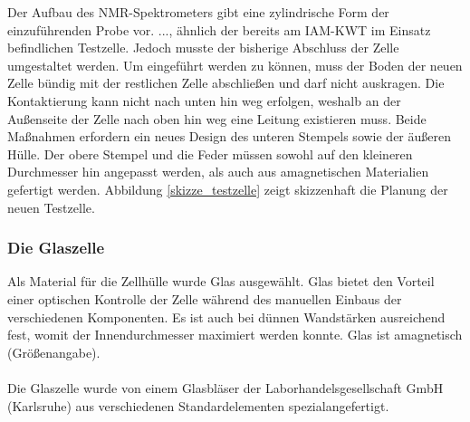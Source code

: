 \documentclass[a4paper, 11pt, headsepline,footsepline,twoside,abstract]{scrbook}
\begin{document}
Der Aufbau des NMR-Spektrometers gibt eine zylindrische Form der einzuführenden Probe vor. ..., ähnlich der bereits am IAM-KWT im Einsatz befindlichen Testzelle. Jedoch musste der bisherige Abschluss der Zelle umgestaltet werden. Um eingeführt werden zu können, muss der Boden der neuen Zelle bündig mit der restlichen Zelle abschließen und darf nicht auskragen. Die Kontaktierung kann nicht nach unten hin weg erfolgen, weshalb an der Außenseite der Zelle nach oben hin weg eine Leitung existieren muss. Beide Maßnahmen erfordern ein neues Design des unteren Stempels sowie der äußeren Hülle. Der obere Stempel und die Feder müssen sowohl auf den kleineren Durchmesser hin angepasst werden, als auch aus amagnetischen Materialien gefertigt werden. Abbildung \ref{skizze_testzelle} zeigt skizzenhaft die Planung der neuen Testzelle.
\subsubsection{Die Glaszelle}
Als Material für die Zellhülle wurde Glas ausgewählt. Glas bietet den Vorteil einer optischen Kontrolle der Zelle während des manuellen Einbaus der verschiedenen Komponenten. Es ist auch bei dünnen Wandstärken ausreichend fest, womit der Innendurchmesser maximiert werden konnte. Glas ist amagnetisch (Größenangabe).
\\\\
Die Glaszelle wurde von einem Glasbläser der Laborhandelsgesellschaft GmbH (Karlsruhe) aus verschiedenen Standardelementen spezialangefertigt.
\end{document}
